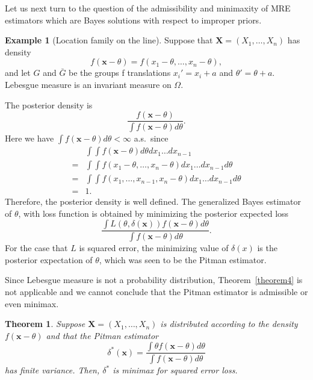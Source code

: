 \documentclass{article}
\theoremstyle{plain}
\newtheorem{theorem}{Theorem}
\theoremstyle{definition}
\newtheorem{example}{Example}
\begin{document}
Let us next turn to the question of the admissibility and minimaxity of MRE estimators which are Bayes solutions with respect to improper priors.
\begin{example}[Location family on the line]
    Suppose that $\mathbf{X}=(X_1,\ldots,X_n)$ has density
    \begin{equation*}
        f(\mathbf{x}-\theta)=f(x_1-\theta,\ldots,x_n-\theta),
    \end{equation*}
    and let $G$ and $\bar{G}$ be the groups f translations $x_i'=x_i+a$ and $\theta'=\theta+a$.
    Lebesgue measure is an invariant measure on $\Omega$.

    The posterior density is
    \begin{equation*}
        \frac{f(\mathbf{x}-\theta)}{\int f(\mathbf{x}-\theta)d\theta}.
    \end{equation*}
    Here we have $\int f(\mathbf{x}-\theta)d\theta <\infty$ a.s.\ since
    \begin{equation*}
        \begin{aligned}
            &\int\int f(\mathbf{x}-\theta)d\theta dx_1\ldots dx_{n-1}\\
            =&
        \int\int f(x_1-\theta,\ldots,x_n-\theta) dx_1\ldots dx_{n-1}d\theta\\
            =&
            \int\int f(x_1,\ldots,x_{n-1},x_n-\theta) dx_1\ldots dx_{n-1}d\theta\\
            =&1.
        \end{aligned}
    \end{equation*}
Therefore, the posterior density is well defined. The generalized Bayes estimator of $\theta$, with loss function is obtained by minimizing the posterior expected loss
\begin{equation*}
    \frac{\int L(\theta,\delta(\mathbf{x}))f(\mathbf{x}-\theta) d\theta}{\int f(\mathbf{x}-\theta)d\theta}.
\end{equation*}
    For the case that $L$ is squared error, the minimizing value of $\delta(x)$ is the posterior expectation of $\theta$, which was seen to be the Pitman estimator.

    Since Lebesgue measure is not a probability distribution, Theorem~\eqref{theorem4} is not applicable and we cannot conclude that the Pitman estimator is admissible or even minimax.
\end{example}
\begin{theorem}\label{theorem5}
    Suppose $\mathbf{X}=(X_1,\ldots,X_n)$ is distributed according to the density $f(\mathbf{x}-\theta)$ and that the Pitman estimator 
    \begin{equation*}
        \delta^*(\mathbf{x})=\frac{\int \theta f(\mathbf{x}-\theta)d\theta}{\int f(\mathbf{x}-\theta)d\theta}
    \end{equation*}
    has finite variance. Then, $\delta^*$ is minimax for squared error loss.
\end{theorem}
\end{document}
